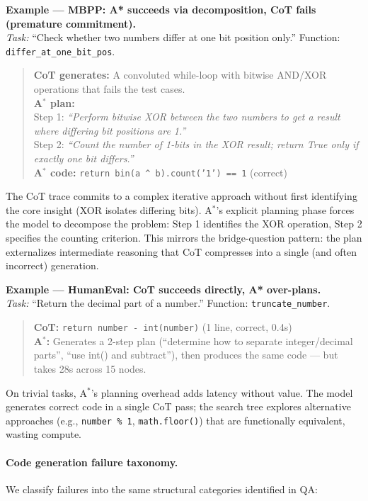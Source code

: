 \documentclass{article}
\newcommand{\astar}{A$^*$\xspace}
\begin{document}
\textbf{Example --- MBPP: A* succeeds via decomposition, CoT fails (premature commitment).}\\
\textit{Task:} ``Check whether two numbers differ at one bit position only.'' Function: \texttt{differ\_at\_one\_bit\_pos}.

\begin{quote}
\textbf{CoT generates:} A convoluted while-loop with bitwise AND/XOR operations that fails the test cases.\\[2pt]
\textbf{\astar plan:}\\
Step 1: \textit{``Perform bitwise XOR between the two numbers to get a result where differing bit positions are 1.''}\\
Step 2: \textit{``Count the number of 1-bits in the XOR result; return True only if exactly one bit differs.''}\\
\textbf{\astar code:} \texttt{return bin(a \^{} b).count('1') == 1} \hfill (correct)
\end{quote}

The CoT trace commits to a complex iterative approach without first identifying the core insight (XOR isolates differing bits). \astar's explicit planning phase forces the model to decompose the problem: Step 1 identifies the XOR operation, Step 2 specifies the counting criterion. This mirrors the bridge-question pattern: the plan externalizes intermediate reasoning that CoT compresses into a single (and often incorrect) generation.

\textbf{Example --- HumanEval: CoT succeeds directly, A* over-plans.}\\
\textit{Task:} ``Return the decimal part of a number.'' Function: \texttt{truncate\_number}.

\begin{quote}
\textbf{CoT:} \texttt{return number - int(number)} \hfill (1 line, correct, 0.4s)\\[2pt]
\textbf{\astar:} Generates a 2-step plan (``determine how to separate integer/decimal parts'', ``use int() and subtract''), then produces the same code --- but takes 28s across 15 nodes.
\end{quote}

On trivial tasks, \astar's planning overhead adds latency without value. The model generates correct code in a single CoT pass; the search tree explores alternative approaches (e.g., \texttt{number \% 1}, \texttt{math.floor()}) that are functionally equivalent, wasting compute.

\paragraph{Code generation failure taxonomy.}
We classify failures into the same structural categories identified in QA:
\end{document}
